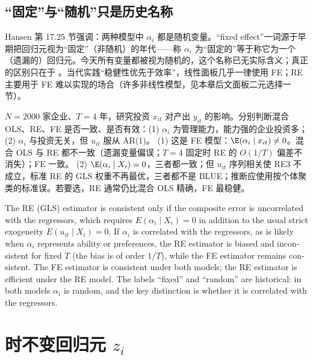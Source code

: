 \subsection{“固定”与“随机”只是历史名称}

Hansen 第 17.25 节强调：两种模型中 $\alpha_i$ 都是随机变量。“fixed effect”一词源于早期把回归元视为“固定”（非随机）的年代——称 $\alpha_i$ 为“固定的”等于称它为一个（遗漏的）回归元。今天所有变量都被视为随机的，这个名称已无实际含义；真正的区别只在于 。当代实践“稳健性优先于效率”，线性面板几乎一律使用 FE；RE 主要用于 FE 难以实现的场合（许多非线性模型，见本章后文面板二元选择一节）。

\begin{prac}[选哪个估计量]\label{pr:U11a-choose}
$N=2000$ 家企业、$T=4$ 年，研究投资 $x_{it}$ 对产出 $y_{it}$ 的影响。分别判断混合 OLS、RE、FE 是否一致、是否有效：(1) $\alpha_i$ 为管理能力，能力强的企业投资多；(2) $\alpha_i$ 与投资无关，但 $u_{it}$ 服从 AR(1)。
\answer
(1) 这是 FE 模型：$\E(\alpha_i\mid x_{it})\neq0$。混合 OLS 与 RE 都不一致（遗漏变量偏误；$T=4$ 固定时 RE 的 $O(1/T)$ 偏差不消失）；FE 一致。
(2) $\E(\alpha_i\mid X_i)=0$，三者都一致；但 $u_{it}$ 序列相关使 RE3 不成立，标准 RE 的 GLS 权重不再最优，三者都不是 BLUE；推断应使用按个体聚类的标准误。若要选，RE 通常仍比混合 OLS 精确，FE 最稳健。
\end{prac}

\begin{english}
The RE (GLS) estimator is consistent only if the composite error is uncorrelated with the regressors, which requires $E(\alpha_i\mid X_i)=0$ in addition to the usual strict exogeneity $E(u_{it}\mid X_i)=0$. If $\alpha_i$ is correlated with the regressors, as is likely when $\alpha_i$ represents ability or preferences, the RE estimator is biased and inconsistent for fixed $T$ (the bias is of order $1/T$), while the FE estimator remains consistent. The FE estimator is consistent under both models; the RE estimator is efficient under the RE model. The labels ``fixed'' and ``random'' are historical: in both models $\alpha_i$ is random, and the key distinction is whether it is correlated with the regressors.
\end{english}

\section{时不变回归元 \texorpdfstring{$z_i$}{z\_i}}\label{sec:U11a-zi}

